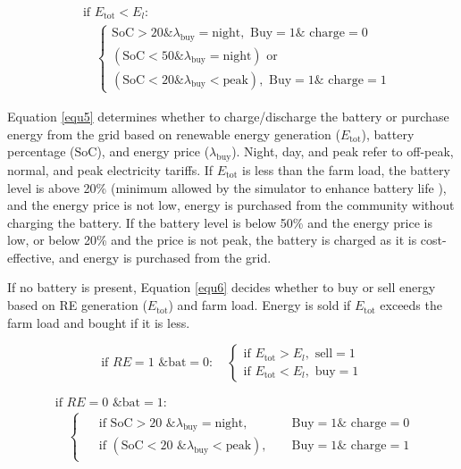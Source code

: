 \documentclass[preprint,12pt]{elsarticle}
\begin{document}
\begin{equation}
\label{equ5}
\begin{aligned}
& \text{if } E_{\text{tot}} < E_{l}: \\
& \quad 
\begin{cases}
\text{SoC} > 20 \&  \lambda_{\text{buy}} = \text{night}, \text{ Buy}=1 \& \text{ charge}=0 \\
(\text{SoC} < 50 \& \lambda_{\text{buy}} = \text{night}) \text{ or} \\
(\text{SoC} < 20 \& \lambda_{\text{buy}} < \text{peak}), \text{ Buy}=1 \& \text{ charge}=1
\end{cases}
\end{aligned}
\end{equation}

Equation \ref{equ5} determines whether to charge/discharge the battery or purchase energy from the grid based on renewable energy generation ($E_{\text{tot}}$), battery percentage ($\text{SoC}$), and energy price ($\lambda_{\text{buy}}$). Night, day, and peak refer to off-peak, normal, and peak electricity tariffs. If $E_{\text{tot}}$ is less than the farm load, the battery level is above 20\% (minimum allowed by the simulator to enhance battery life \cite{saxena2016cycle}), and the energy price is not low, energy is purchased from the community without charging the battery. If the battery level is below 50\% and the energy price is low, or below 20\% and the price is not peak, the battery is charged as it is cost-effective, and energy is purchased from the grid.

If no battery is present, Equation \ref{equ6} decides whether to buy or sell energy based on RE generation ($E_{\text{tot}}$) and farm load. Energy is sold if $E_{\text{tot}}$ exceeds the farm load and bought if it is less.

\begin{equation}
\label{equ6}
\text{if } RE = 1 \text{ \& } \text{bat} = 0: \quad
\begin{cases}
\text{if } E_{\text{tot}} > E_{l}, \text{ sell}=1 \\
\text{if } E_{\text{tot}} < E_{l}, \text{ buy}=1
\end{cases}
\end{equation}

\begin{equation}
\label{equ7}
\begin{aligned}
& \text{if } RE = 0 \text{ \& } \text{bat} = 1: \\
& \quad 
\begin{cases}
\begin{aligned}
& \text{if } \text{SoC} > 20 \text{ \& } \lambda_{\text{buy}} = \text{night}, && \text{ Buy}=1 \& \text{ charge}=0 \\
& \text{if } (\text{SoC} < 20 \text{ \& } \lambda_{\text{buy}} < \text{peak}), && \text{ Buy}=1 \& \text{ charge}=1
\end{aligned}
\end{cases}
\end{aligned}
\end{equation}
\end{document}
